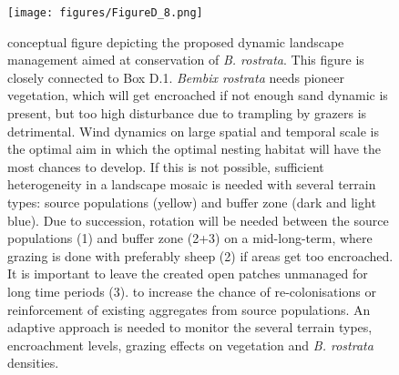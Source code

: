 \documentclass[10pt, twoside]{book} %
\begin{document}
	\begin{figure}[h!]
		\begin{center}
			\texttt{[image: figures/FigureD\_8.png]}
		\end{center}
		\begin{footnotesize}
			\caption{conceptual figure depicting the proposed dynamic landscape management aimed at conservation of \textit{B. rostrata}. This figure is closely connected to Box D.1. \textit{Bembix rostrata} needs pioneer vegetation, which will get encroached if not enough sand dynamic is present, but too high disturbance due to trampling by grazers is detrimental. Wind dynamics on large spatial and temporal scale is the optimal aim in which the optimal nesting habitat will have the most chances to develop. If this is not possible, sufficient heterogeneity in a landscape mosaic is needed with several terrain types: source populations (yellow) and buffer zone (dark and light blue). Due to succession, rotation will be needed between the source populations (1) and buffer zone (2+3) on a mid-long-term, where grazing is done with preferably sheep (2) if areas get too encroached. It is important to leave the created open patches unmanaged for long time periods (3). to increase the chance of re-colonisations or reinforcement of existing aggregates from source populations. An adaptive approach is needed to monitor the several terrain types, encroachment levels, grazing effects on vegetation and \textit{B. rostrata} densities. \label{figD.8}}
		\end{footnotesize}
	\end{figure}

\clearpage
	
\end{document}
